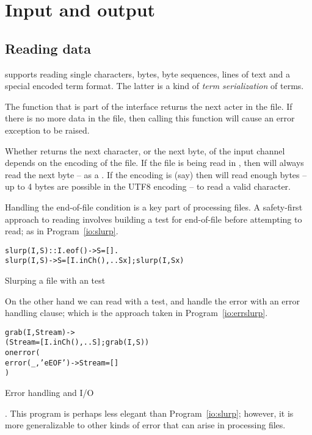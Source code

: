 \section{Input and output}

\subsection{Reading data}
\label{io:reading}

\go supports reading single characters, bytes, byte sequences, lines of text and a special encoded term format. The latter is a kind of \emph{term serialization} of \go terms.

The  function that is part of the  interface returns the next acter in the file. If there is no more data in the file, then calling this function will cause an error exception to be raised.

\begin{aside}
Whether  returns the next character, or the next byte, of the input channel depends on the encoding of the file. If the file is being read in , then  will always read the next byte -- as a . If the encoding is  (say) then  will read enough bytes -- up to 4 bytes are possible in the UTF8 encoding -- to read a valid character.
\end{aside}

Handling the end-of-file condition is a key part of processing files. A safety-first approach to reading involves building a test for end-of-file before attempting to read; as in Program~\vref{io:slurp}.

\begin{program}
\begin{alltt}
slurp(I,S)::I.eof() -> S=[].
slurp(I,S) -> S=[I.inCh(),..Sx]; slurp(I,Sx)
\end{alltt}
\caption{Slurping a file with an  test\label{io:slurp}}
\end{program}
On the other hand we can read with a test, and handle the error with an error handling clause; which is the approach taken in Program~\vref{io:errslurp}.
\begin{program}
\begin{alltt}
grab(I,Stream) -> 
  (Stream=[I.inCh(),..S];grab(I,S))
  onerror (
    error(_,'eEOF') -> Stream=[]
  )
\end{alltt}
\caption{Error handling and I/O\label{io:errslurp}}
\end{program}.
This program is perhaps less elegant than Program~\vref{io:slurp}; however, it is more generalizable to other kinds of error that can arise in processing files.

